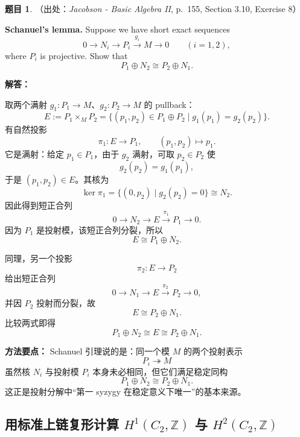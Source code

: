 \documentclass[a4paper]{ctexart}
\theoremstyle{definition}
\newtheorem{example}{题目}[section]
\theoremstyle{analysis}
\theoremstyle{plain}
\begin{document}
\begin{example}
（出处：\textit{Jacobson - Basic Algebra II}, p.~155, Section 3.10, Exercise 8）

\textbf{Schanuel's lemma.}
Suppose we have short exact sequences
\[
  0\longrightarrow N_i\longrightarrow P_i\xrightarrow{g_i}M\longrightarrow 0
  \qquad (i=1,2),
\]
where \(P_i\) is projective. Show that
\[
  P_1\oplus N_2\cong P_2\oplus N_1.
\]

\textbf{解答：}

取两个满射 \(g_1:P_1\to M\)、\(g_2:P_2\to M\) 的 pullback：
\[
  E:=P_1\times_M P_2
  =
  \{(p_1,p_2)\in P_1\oplus P_2\mid g_1(p_1)=g_2(p_2)\}.
\]
有自然投影
\[
  \pi_1:E\to P_1,\qquad (p_1,p_2)\mapsto p_1.
\]
它是满射：给定 \(p_1\in P_1\)，由于 \(g_2\) 满射，可取 \(p_2\in P_2\) 使
\[
  g_2(p_2)=g_1(p_1),
\]
于是 \((p_1,p_2)\in E\)。其核为
\[
  \ker\pi_1
  =
  \{(0,p_2)\mid g_2(p_2)=0\}
  \cong N_2.
\]
因此得到短正合列
\[
  0\longrightarrow N_2\longrightarrow E\xrightarrow{\pi_1}P_1\longrightarrow 0.
\]
因为 \(P_1\) 是投射模，该短正合列分裂，所以
\[
  E\cong P_1\oplus N_2.
\]

同理，另一个投影
\[
  \pi_2:E\to P_2
\]
给出短正合列
\[
  0\longrightarrow N_1\longrightarrow E\xrightarrow{\pi_2}P_2\longrightarrow 0,
\]
并因 \(P_2\) 投射而分裂，故
\[
  E\cong P_2\oplus N_1.
\]
比较两式即得
\[
  P_1\oplus N_2\cong E\cong P_2\oplus N_1.
\]

\textbf{方法要点：}
Schanuel 引理说的是：同一个模 \(M\) 的两个投射表示
\[
  P_i\twoheadrightarrow M
\]
虽然核 \(N_i\) 与投射模 \(P_i\) 本身未必相同，但它们满足稳定同构
\[
  P_1\oplus N_2\cong P_2\oplus N_1.
\]
这正是投射分解中“第一 syzygy 在稳定意义下唯一”的基本来源。
\end{example}


\subsection{\texorpdfstring{用标准上链复形计算 \(H^1(C_2,\mathbb Z)\) 与 \(H^2(C_2,\mathbb Z)\)}{用标准上链复形计算 H1(C2,Z) 与 H2(C2,Z)}}\label{subsec:problem-c2-cohomology-cochains}
\end{document}
